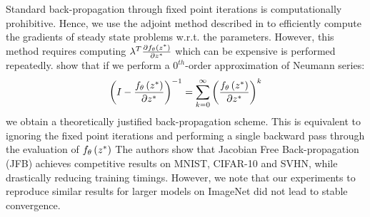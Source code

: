 Standard back-propagation through fixed point iterations is computationally prohibitive. Hence, we use the adjoint method described in  to efficiently compute the gradients of steady state problems w.r.t. the parameters. However, this method requires computing $\lambda^T \frac{\partial f_\theta\left(z^*\right)}{\partial z^{*}}$ which can be expensive is performed repeatedly. \citet{fung2022jfb} show that if we perform a $0^{th}$-order approximation of Neumann series:
%
\begin{equation}
  \left( I - \frac{f_\theta\left(z^*\right)}{\partial z^{*}} \right)^{-1} = \sum_{k = 0}^\infty \left( \frac{f_\theta\left(z^*\right)}{\partial z^{*}} \right)^k
\end{equation}
%
we obtain a theoretically justified back-propagation scheme. This is equivalent to ignoring the fixed point iterations and performing a single backward pass through the evaluation of $f_\theta\left(z^*\right)$ The authors show that Jacobian Free Back-propagation (JFB) achieves competitive results on MNIST, CIFAR-10 and SVHN, while drastically reducing training timings. However, we note that our experiments to reproduce similar results for larger models on ImageNet did not lead to stable convergence.


